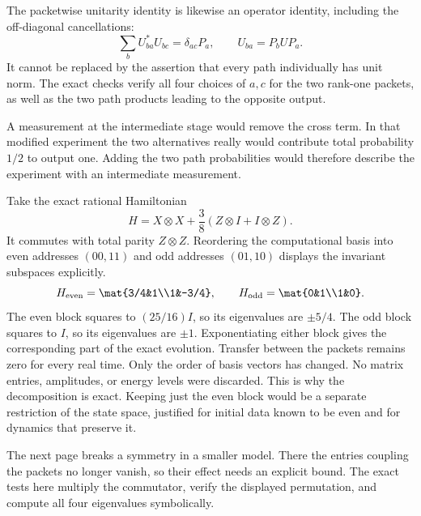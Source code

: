 The packetwise unitarity identity is likewise an operator identity, including the off-diagonal cancellations:
\[
\sum_b U_{ba}^*U_{bc}=\delta_{ac}P_a,
\qquad U_{ba}=P_bUP_a.
\]
It cannot be replaced by the assertion that every path individually has unit norm. The exact checks verify all four choices of $a,c$ for the two rank-one packets, as well as the two path products leading to the opposite output.

A measurement at the intermediate stage would remove the cross term. In that modified experiment the two alternatives really would contribute total probability $1/2$ to output one. Adding the two path probabilities would therefore describe the experiment with an intermediate measurement.

Take the exact rational Hamiltonian
\[
H=X\otimes X+\frac38(Z\otimes I+I\otimes Z).
\]
It commutes with total parity $Z\otimes Z$. Reordering the computational basis into even addresses $(00,11)$ and odd addresses $(01,10)$ displays the invariant subspaces explicitly.
\[
H_{\rm even}=\mat{3/4&1\\1&-3/4},\qquad
H_{\rm odd}=\mat{0&1\\1&0}.
\]
The even block squares to $(25/16)I$, so its eigenvalues are $\pm5/4$. The odd block squares to $I$, so its eigenvalues are $\pm1$. Exponentiating either block gives the corresponding part of the exact evolution. Transfer between the packets remains zero for every real time.
Only the order of basis vectors has changed. No matrix entries, amplitudes, or energy levels were discarded. This is why the decomposition is exact. Keeping just the even block would be a separate restriction of the state space, justified for initial data known to be even and for dynamics that preserve it.

The next page breaks a symmetry in a smaller model. There the entries coupling the packets no longer vanish, so their effect needs an explicit bound. The exact tests here multiply the commutator, verify the displayed permutation, and compute all four eigenvalues symbolically.

